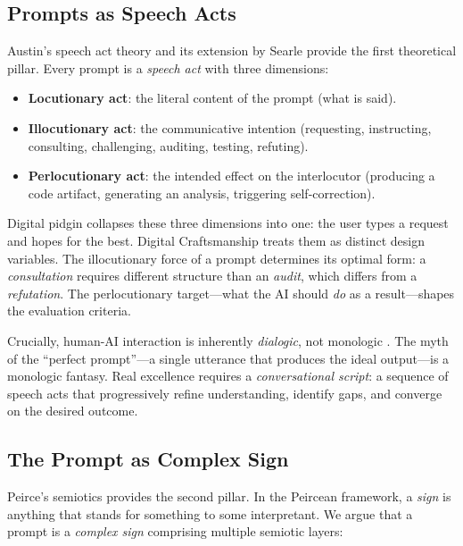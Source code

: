 \documentclass[11pt,a4paper]{article}
\begin{document}
\subsection{Prompts as Speech Acts}

Austin's speech act theory \citep{austin1962things} and its extension by Searle \citep{searle1969speech} provide the first theoretical pillar. Every prompt is a \emph{speech act} with three dimensions:

\begin{itemize}
    \item \textbf{Locutionary act}: the literal content of the prompt (what is said).
    \item \textbf{Illocutionary act}: the communicative intention (requesting, instructing, consulting, challenging, auditing, testing, refuting).
    \item \textbf{Perlocutionary act}: the intended effect on the interlocutor (producing a code artifact, generating an analysis, triggering self-correction).
\end{itemize}

Digital pidgin collapses these three dimensions into one: the user types a request and hopes for the best. Digital Craftsmanship treats them as distinct design variables. The illocutionary force of a prompt determines its optimal form: a \emph{consultation} requires different structure than an \emph{audit}, which differs from a \emph{refutation}. The perlocutionary target---what the AI should \emph{do} as a result---shapes the evaluation criteria.

Crucially, human-AI interaction is inherently \emph{dialogic}, not monologic \citep{bakhtin1981dialogic}. The myth of the ``perfect prompt''---a single utterance that produces the ideal output---is a monologic fantasy. Real excellence requires a \emph{conversational script}: a sequence of speech acts that progressively refine understanding, identify gaps, and converge on the desired outcome.

\subsection{The Prompt as Complex Sign}

Peirce's semiotics \citep{peirce1931collected} provides the second pillar. In the Peircean framework, a \emph{sign} is anything that stands for something to some interpretant. We argue that a prompt is a \emph{complex sign} comprising multiple semiotic layers:
\end{document}
